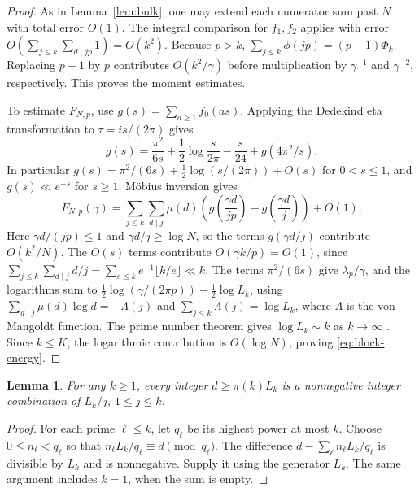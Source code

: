 \documentclass[11pt]{amsart}
\newtheorem{lemma}[theorem]{Lemma}
\theoremstyle{remark}
\begin{document}
\begin{proof}
As in Lemma~\ref{lem:bulk}, one may extend each numerator sum past \(N\) with total error \(O(1)\). The integral comparison for \(f_1,f_2\) applies with error \(O(\sum_{j\le k}\sum_{d\mid jp}1)=O(k^2)\). Because \(p>k\), \(\sum_{j\le k}\phi(jp)=(p-1)\Phi_k\). Replacing \(p-1\) by \(p\) contributes \(O(k^2/\gamma)\) before multiplication by \(\gamma^{-1}\) and \(\gamma^{-2}\), respectively. This proves the moment estimates.

To estimate \(F_{N,p}\), use \(g(s)=\sum_{a\ge1} f_0(as)\). Applying the Dedekind eta transformation to \(\tau=is/(2\pi)\) \cite[Ch.~3]{apostol-modular} gives
\begin{equation}
 g(s)=\frac{\pi^2}{6s}+\frac12\log\frac{s}{2\pi}-\frac{s}{24}
          +g(4\pi^2/s).
 \label{eq:eta}
\end{equation}
In particular \(g(s)=\pi^2/(6s)+\tfrac12\log(s/(2\pi))+O(s)\) for \(0<s\le1\), and \(g(s)\ll e^{-s}\) for \(s\ge1\). M\"obius inversion gives
\[
 F_{N,p}(\gamma)=\sum_{j\le k}\sum_{d\mid j}\mu(d)
 \left(g\left(\frac{\gamma d}{jp}\right)-g\left(\frac{\gamma d}{j}\right)\right)
 +O(1).
\]
Here \(\gamma d/(jp)\le1\) and \(\gamma d/j\ge\log N\), so the terms \(g(\gamma d/j)\) contribute \(O(k^2/N)\). The \(O(s)\) terms contribute \(O(\gamma k/p)=O(1)\), since
\(\sum_{j\le k}\sum_{d\mid j}d/j=\sum_{e\le k}e^{-1}\lfloor k/e\rfloor\ll k\).
The terms \(\pi^2/(6s)\) give \(\lambda_p/\gamma\), and the logarithms sum to
\(\frac12\log(\gamma/(2\pi p))-\frac12\log L_k\), using
\(\sum_{d\mid j}\mu(d)\log d=-\Lambda(j)\) and \(\sum_{j\le k}\Lambda(j)=\log L_k\), where \(\Lambda\) is the von Mangoldt function. The prime number theorem gives \(\log L_k\sim k\) as \(k\to\infty\) \cite[Section~6.2, (6.12)]{montgomery-vaughan}. Since \(k\le K\), the logarithmic contribution is \(O(\log N)\), proving \eqref{eq:block-energy}.
\end{proof}

\begin{lemma}
\label{lem:completion}
For any \(k\ge1\), every integer \(d\ge\pi(k)L_k\) is a nonnegative integer combination of \(L_k/j\), \(1\le j\le k\).
\end{lemma}

\begin{proof}
For each prime \(\ell\le k\), let \(q_\ell\) be its highest power at most \(k\). Choose \(0\le n_\ell<q_\ell\) so that \(n_\ell L_k/q_\ell\equiv d\pmod{q_\ell}\). The difference \(d-\sum_\ell n_\ell L_k/q_\ell\) is divisible by \(L_k\) and is nonnegative. Supply it using the generator \(L_k\). The same argument includes \(k=1\), when the sum is empty.
\end{proof}
\end{document}
